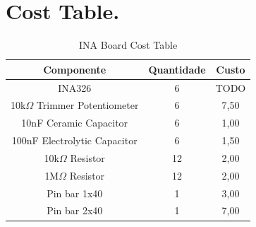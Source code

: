 \chapter{Cost Table.}

\begin{table}[htb]
  \begin{center}
    \ABNTEXreducedfont
    \caption[INA Board Cost Table]{INA Board Cost Table}
    \label{Cost-table}
    \begin{tabular}{|c|c|c|}
      \hline
    Componente & Quantidade & Custo \\ \hline
    INA326 & 6 & TODO\\ \hline
    10k$\Omega$ Trimmer Potentiometer & 6 & 7,50 \\ \hline
    10nF Ceramic Capacitor & 6 & 1,00 \\ \hline
    100nF Electrolytic Capacitor & 6 & 1,50 \\ \hline
    10k$\Omega$ Resistor & 12 & 2,00 \\ \hline
    1M$\Omega$ Resistor & 12 & 2,00 \\ \hline
    Pin bar 1x40 & 1 & 3,00 \\ \hline
    Pin bar 2x40 & 1 & 7,00 \\ \hline
  \end{tabular}
\end{center}
\end{table}
